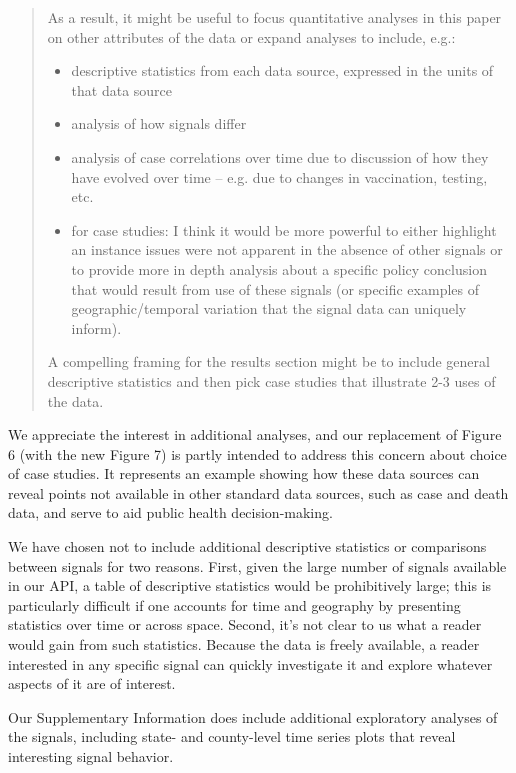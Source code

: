 \documentclass[11pt]{article}
\begin{document}
\begin{quote}
  As a result, it might be useful to focus quantitative analyses in this paper
  on other attributes of the data or expand analyses to include, e.g.:
  \begin{itemize}
  \item descriptive statistics from each data source, expressed in the units of
    that data source
  \item analysis of how signals differ
  \item analysis of case correlations over time due to discussion of how they
    have evolved over time -- e.g. due to changes in vaccination, testing, etc.
  \item for case studies: I think it would be more powerful to either highlight
    an instance issues were not apparent in the absence of other signals or to
    provide more in depth analysis about a specific policy conclusion that would
    result from use of these signals (or specific examples of
    geographic/temporal variation that the signal data can uniquely inform).
  \end{itemize}
  A compelling framing for the results section might be to include general
  descriptive statistics and then pick case studies that illustrate 2-3 uses of
  the data.
\end{quote}
We appreciate the interest in additional analyses, and our replacement of Figure
6 (with the new Figure 7) is partly intended to address this concern about
choice of case studies. It represents an example showing how these data sources
can reveal points not available in other standard data sources, such as case and
death data, and serve to aid public health decision-making.

We have chosen not to include additional descriptive statistics or comparisons
between signals for two reasons. First, given the large number of signals
available in our API, a table of descriptive statistics would be prohibitively
large; this is particularly difficult if one accounts for time and geography by
presenting statistics over time or across space. Second, it's not clear to us
what a reader would gain from such statistics. Because the data is freely
available, a reader interested in any specific signal can quickly investigate it
and explore whatever aspects of it are of interest.

Our Supplementary Information does include additional exploratory analyses of
the signals, including state- and county-level time series plots that reveal
interesting signal behavior.
\end{document}
